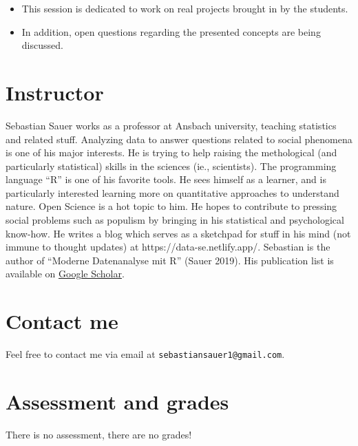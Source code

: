 \documentclass[
  letterpaper,
  DIV=11,
  numbers=noendperiod]{scrreprt}
\theoremstyle{definition}
\theoremstyle{definition}
\theoremstyle{remark}
\begin{document}
\begin{itemize}
\item
  This session is dedicated to work on real projects brought in by the
  students.
\item
  In addition, open questions regarding the presented concepts are being
  discussed.
\end{itemize}

\hypertarget{instructor}{%
\section*{Instructor}\label{instructor}}

Sebastian Sauer works as a professor at Ansbach university, teaching
statistics and related stuff. Analyzing data to answer questions related
to social phenomena is one of his major interests. He is trying to help
raising the methological (and particularly statistical) skills in the
sciences (ie., scientists). The programming language ``R'' is one of his
favorite tools. He sees himself as a learner, and is particularly
interested learning more on quantitative approaches to understand
nature. Open Science is a hot topic to him. He hopes to contribute to
pressing social problems such as populism by bringing in his statistical
and psychological know-how. He writes a blog which serves as a sketchpad
for stuff in his mind (not immune to thought updates) at
https://data-se.netlify.app/. Sebastian is the author of ``Moderne
Datenanalyse mit R'' (Sauer 2019). His publication list is available on
\href{https://scholar.google.de/citations?user=r-2ssnAAAAAJ\&hl=en}{Google
Scholar}.

\hypertarget{contact-me}{%
\section*{Contact me}\label{contact-me}}

Feel free to contact me via email at \texttt{sebastiansauer1@gmail.com}.

\hypertarget{assessment-and-grades}{%
\section*{Assessment and grades}\label{assessment-and-grades}}

There is no assessment, there are no grades!
\end{document}
